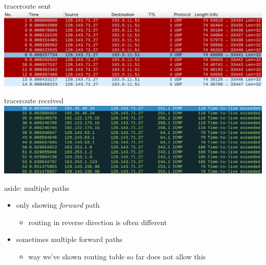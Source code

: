 \begin{frame}{traceroute sent}
\includegraphics[width=\textwidth]{traceroute-v4-send}
\end{frame}

\begin{frame}{traceroute received}
\includegraphics[width=\textwidth]{traceroute-v4-recv}
\end{frame}

\begin{frame}{aside: multiple paths}
    \begin{itemize}
    \item only showing \textit{forward} path
        \begin{itemize}
        \item routing in reverse direction is often different
        \end{itemize}
    \item sometimes multiple forward paths
        \begin{itemize}
        \item way we've shown routing table so far does not allow this
        \end{itemize}
    \end{itemize}
\end{frame}
